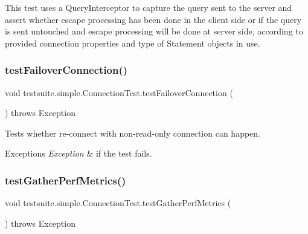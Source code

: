 This test uses a Query\+Interceptor to capture the query sent to the server and assert whether escape processing has been done in the client side or if the query is sent untouched and escape processing will be done at server side, according to provided connection properties and type of Statement objects in use. \mbox{\label{classtestsuite_1_1simple_1_1_connection_test_a6e0b85502950068c4a43a70f70f93a56}} 
\subsubsection{\texorpdfstring{test\+Failover\+Connection()}{testFailoverConnection()}}
{\footnotesize\ttfamily void testsuite.\+simple.\+Connection\+Test.\+test\+Failover\+Connection (\begin{DoxyParamCaption}{ }\end{DoxyParamCaption}) throws Exception}

Tests whether re-\/connect with non-\/read-\/only connection can happen.


\begin{DoxyExceptions}{Exceptions}
{\em Exception} & if the test fails. \\
\hline
\end{DoxyExceptions}
\mbox{\label{classtestsuite_1_1simple_1_1_connection_test_a3efc92c350b402367a66355fe3305381}} 
\subsubsection{\texorpdfstring{test\+Gather\+Perf\+Metrics()}{testGatherPerfMetrics()}}
{\footnotesize\ttfamily void testsuite.\+simple.\+Connection\+Test.\+test\+Gather\+Perf\+Metrics (\begin{DoxyParamCaption}{ }\end{DoxyParamCaption}) throws Exception}

